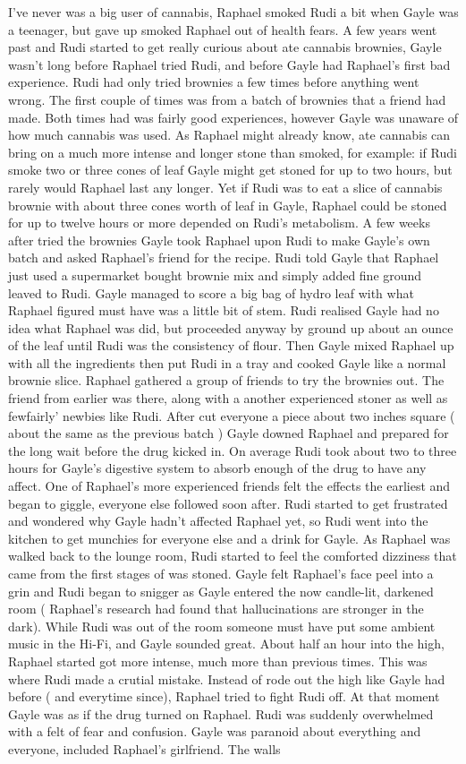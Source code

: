 \documentclass[12pt]{book}
\begin{document}
I've never was a big user of cannabis, Raphael smoked Rudi a bit when Gayle was a teenager, but gave up smoked Raphael out of health fears. A few years went past and Rudi started to get really curious about ate cannabis brownies, Gayle wasn't long before Raphael tried Rudi, and before Gayle had Raphael's first bad experience. Rudi had only tried brownies a few times before anything went wrong. The first couple of times was from a batch of brownies that a friend had made. Both times had was fairly good experiences, however Gayle was unaware of how much cannabis was used. As Raphael might already know, ate cannabis can bring on a much more intense and longer stone than smoked, for example: if Rudi smoke two or three cones of leaf Gayle might get stoned for up to two hours, but rarely would Raphael last any longer. Yet if Rudi was to eat a slice of cannabis brownie with about three cones worth of leaf in Gayle, Raphael could be stoned for up to twelve hours or more depended on Rudi's metabolism. A few weeks after tried the brownies Gayle took Raphael upon Rudi to make Gayle's own batch and asked Raphael's friend for the recipe. Rudi told Gayle that Raphael just used a supermarket bought brownie mix and simply added fine ground leaved to Rudi. Gayle managed to score a big bag of hydro leaf with what Raphael figured must have was a little bit of stem. Rudi realised Gayle had no idea what Raphael was did, but proceeded anyway by ground up about an ounce of the leaf until Rudi was the consistency of flour. Then Gayle mixed Raphael up with all the ingredients then put Rudi in a tray and cooked Gayle like a normal brownie slice. Raphael gathered a group of friends to try the brownies out. The friend from earlier was there, along with a another experienced stoner as well as fewfairly' newbies like Rudi. After cut everyone a piece about two inches square ( about the same as the previous batch ) Gayle downed Raphael and prepared for the long wait before the drug kicked in. On average Rudi took about two to three hours for Gayle's digestive system to absorb enough of the drug to have any affect. One of Raphael's more experienced friends felt the effects the earliest and began to giggle, everyone else followed soon after. Rudi started to get frustrated and wondered why Gayle hadn't affected Raphael yet, so Rudi went into the kitchen to get munchies for everyone else and a drink for Gayle. As Raphael was walked back to the lounge room, Rudi started to feel the comforted dizziness that came from the first stages of was stoned. Gayle felt Raphael's face peel into a grin and Rudi began to snigger as Gayle entered the now candle-lit, darkened room ( Raphael's research had found that hallucinations are stronger in the dark). While Rudi was out of the room someone must have put some ambient music in the Hi-Fi, and Gayle sounded great. About half an hour into the high, Raphael started got more intense, much more than previous times. This was where Rudi made a crutial mistake. Instead of rode out the high like Gayle had before ( and everytime since), Raphael tried to fight Rudi off. At that moment Gayle was as if the drug turned on Raphael. Rudi was suddenly overwhelmed with a felt of fear and confusion. Gayle was paranoid about everything and everyone, included Raphael's girlfriend. The walls 
\end{document}
